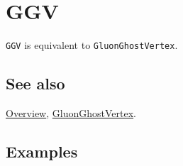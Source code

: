 \documentclass[../FeynCalcManual.tex]{subfiles}
\begin{document}
\hypertarget{ggv}{%
\section{GGV}\label{ggv}}

\texttt{GGV} is equivalent to \texttt{GluonGhostVertex}.

\subsection{See also}

\hyperlink{toc}{Overview},
\hyperlink{gluonghostvertex}{GluonGhostVertex}.

\subsection{Examples}
\end{document}
